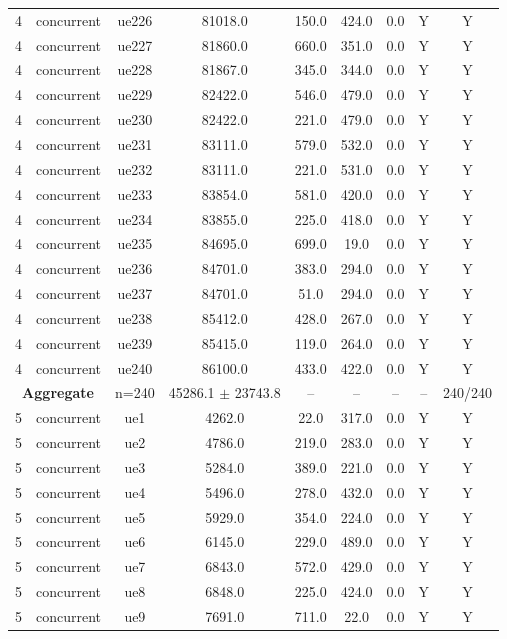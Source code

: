 \begin{table}[ht]
\begin{tabular}{|c|c|c|c|c|c|c|c|c|}
4 & concurrent & ue226 & 81018.0 & 150.0 & 424.0 & 0.0 & Y & Y \\
4 & concurrent & ue227 & 81860.0 & 660.0 & 351.0 & 0.0 & Y & Y \\
4 & concurrent & ue228 & 81867.0 & 345.0 & 344.0 & 0.0 & Y & Y \\
4 & concurrent & ue229 & 82422.0 & 546.0 & 479.0 & 0.0 & Y & Y \\
4 & concurrent & ue230 & 82422.0 & 221.0 & 479.0 & 0.0 & Y & Y \\
4 & concurrent & ue231 & 83111.0 & 579.0 & 532.0 & 0.0 & Y & Y \\
4 & concurrent & ue232 & 83111.0 & 221.0 & 531.0 & 0.0 & Y & Y \\
4 & concurrent & ue233 & 83854.0 & 581.0 & 420.0 & 0.0 & Y & Y \\
4 & concurrent & ue234 & 83855.0 & 225.0 & 418.0 & 0.0 & Y & Y \\
4 & concurrent & ue235 & 84695.0 & 699.0 & 19.0 & 0.0 & Y & Y \\
4 & concurrent & ue236 & 84701.0 & 383.0 & 294.0 & 0.0 & Y & Y \\
4 & concurrent & ue237 & 84701.0 & 51.0 & 294.0 & 0.0 & Y & Y \\
4 & concurrent & ue238 & 85412.0 & 428.0 & 267.0 & 0.0 & Y & Y \\
4 & concurrent & ue239 & 85415.0 & 119.0 & 264.0 & 0.0 & Y & Y \\
4 & concurrent & ue240 & 86100.0 & 433.0 & 422.0 & 0.0 & Y & Y \\
\multicolumn{2}{|c|}{\textbf{Aggregate}} & n=240 & 45286.1 $\pm$ 23743.8 & -- & -- & -- & -- & 240/240 \\
\hline
5 & concurrent & ue1 & 4262.0 & 22.0 & 317.0 & 0.0 & Y & Y \\
5 & concurrent & ue2 & 4786.0 & 219.0 & 283.0 & 0.0 & Y & Y \\
5 & concurrent & ue3 & 5284.0 & 389.0 & 221.0 & 0.0 & Y & Y \\
5 & concurrent & ue4 & 5496.0 & 278.0 & 432.0 & 0.0 & Y & Y \\
5 & concurrent & ue5 & 5929.0 & 354.0 & 224.0 & 0.0 & Y & Y \\
5 & concurrent & ue6 & 6145.0 & 229.0 & 489.0 & 0.0 & Y & Y \\
5 & concurrent & ue7 & 6843.0 & 572.0 & 429.0 & 0.0 & Y & Y \\
5 & concurrent & ue8 & 6848.0 & 225.0 & 424.0 & 0.0 & Y & Y \\
5 & concurrent & ue9 & 7691.0 & 711.0 & 22.0 & 0.0 & Y & Y \\

\end{tabular}
\end{table}
